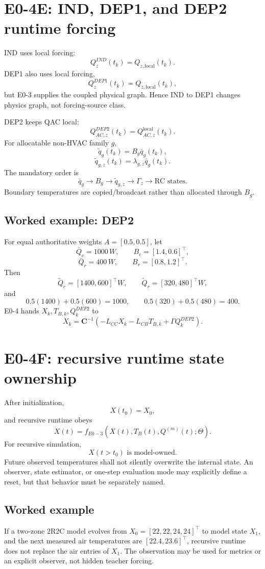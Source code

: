 \documentclass[11pt]{article}
\begin{document}
\section{E0-4E: IND, DEP1, and DEP2 runtime forcing}
IND uses local forcing:
\[
\boxed{Q_z^{IND}(t_k)=Q_{z,\mathrm{local}}(t_k)}.
\]
DEP1 also uses local forcing,
\[
\boxed{Q_z^{DEP1}(t_k)=Q_{z,\mathrm{local}}(t_k)},
\]
but E0-3 supplies the coupled physical graph. Hence IND to DEP1 changes physics graph, not
forcing-source class.

DEP2 keeps QAC local:
\[
\boxed{Q_{AC,z}^{DEP2}(t_k)=Q_{AC,z}^{\mathrm{local}}(t_k)}.
\]
For allocatable non-HVAC family \(g\),
\[
\boxed{\widetilde q_g(t_k)=B_g\bar q_g(t_k)},
\]
\[
\boxed{\widetilde q_{g,z}(t_k)=\lambda_{g,z}\bar q_g(t_k)}.
\]
The mandatory order is
\[
\boxed{\bar q_g\rightarrow B_g\rightarrow\widetilde q_{g,z}\rightarrow\Gamma_z\rightarrow\text{RC states}}.
\]
Boundary temperatures are copied/broadcast rather than allocated through \(B_g\).

\subsection*{Worked example: DEP2}
For equal authoritative weights \(A=[0.5,0.5]\), let
\[
\bar Q_c=1000\,W,\qquad B_c=[1.4,0.6]^\top,
\]
\[
\bar Q_r=400\,W,\qquad B_r=[0.8,1.2]^\top.
\]
Then
\[
\widetilde Q_c=[1400,600]^\top W,\qquad
\widetilde Q_r=[320,480]^\top W,
\]
and
\[
0.5(1400)+0.5(600)=1000,\qquad
0.5(320)+0.5(480)=400.
\]
E0-4 hands \(X_k,T_{B,k},Q_k^{DEP2}\) to
\[
\boxed{\dot X_k=\mathbf C^{-1}(-L_{CC}X_k-L_{CB}T_{B,k}+\Gamma Q_k^{DEP2})}.
\]

\section{E0-4F: recursive runtime state ownership}
After initialization,
\[
X(t_0)=X_0,
\]
and recursive runtime obeys
\[
\boxed{\dot X(t)=f_{E0-3}(X(t),T_B(t),Q^{(m)}(t);\Theta)}.
\]
For recursive simulation,
\[
\boxed{X(t>t_0)\text{ is model-owned}}.
\]
Future observed temperatures shall not silently overwrite the internal state. An observer,
state estimator, or one-step evaluation mode may explicitly define a reset, but that behavior
must be separately named.

\subsection*{Worked example}
If a two-zone 2R2C model evolves from \(X_0=[22,22,24,24]^\top\) to model state \(X_1\),
and the next measured air temperatures are \([22.4,23.6]^\top\), recursive runtime does not
replace the air entries of \(X_1\). The observation may be used for metrics or an explicit
observer, not hidden teacher forcing.
\end{document}
